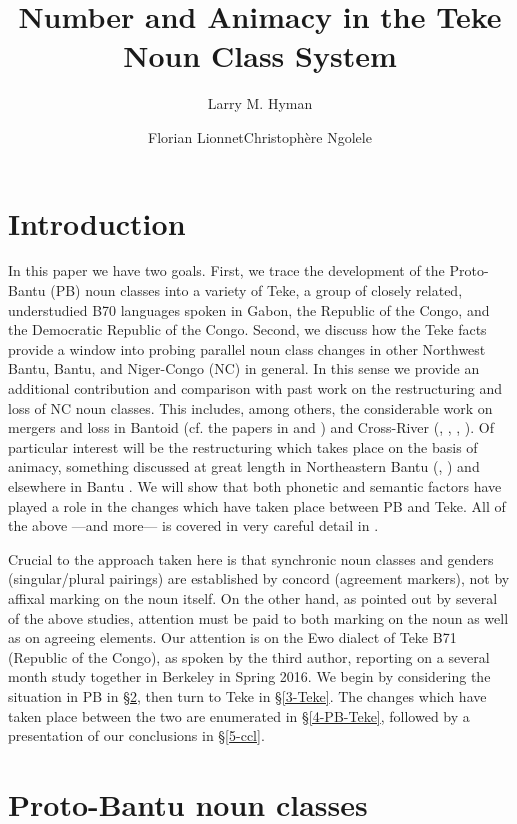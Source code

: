 \documentclass[output=paper,,modfonts,nonflat]{langsci/langscibook-Hyman-et-al}
\title{Number and Animacy in the Teke Noun Class System}
\author{Larry M. Hyman\affiliation{University of California, Berkeley}\and  Florian Lionnet\affiliation{Princeton University}\lastand  Christophère Ngolele\affiliation{Université Catholique d'Afrique Centrale, Yaoundé}}
\begin{document}
\maketitle
\section{Introduction} 
\label{intro}

In this paper we have two goals. First, we trace the development of the Proto-Bantu (PB) noun classes into a variety of Teke, a group of closely related, understudied B70 languages spoken in Gabon, the Republic of the Congo, and the Democratic Republic of the Congo. Second, we discuss how the Teke facts provide a window into probing parallel noun class changes in other Northwest Bantu, Bantu, and Niger-Congo (NC) in general. In this sense we provide an additional contribution and comparison with past work on the restructuring and loss of NC noun classes. This includes, among others, the considerable work on mergers and loss in Bantoid (cf. the papers in \cite{hyman1980}  and \cite{hymanvoorhoeve1980}) and Cross-River (\cite{williamson1985}, \cite{faraclas1986}, \cite{connell1987}, \cite{hymanudoh2006}). Of particular interest will be the restructuring which takes place on the basis of animacy, something discussed at great length in Northeastern Bantu (\cite{wald1975}, \cite{contini2008}) and elsewhere in Bantu . We will show that both phonetic and semantic factors have played a role in the changes which have taken place between PB and Teke. All of the above ---and more--- is covered in very careful detail in \citet{good2012}.

Crucial to the approach taken here is that synchronic noun classes and genders (singular/plural pairings) are established by concord (agreement markers), not by affixal marking on the noun itself. On the other hand, as pointed out by several of the above studies, attention must be paid to both marking on the noun as well as on agreeing elements. Our attention is on the Ewo dialect of Teke B71 (Republic of the Congo), as spoken by the third author, reporting on a several month study together in Berkeley in Spring 2016. We begin by considering the situation in PB in \S\ref{2-PB}, then turn to Teke in \S\ref{3-Teke}. The changes which have taken place between the two are enumerated in \S\ref{4-PB-Teke}, followed by a presentation of our conclusions in \S\ref{5-ccl}.


\section{Proto-Bantu noun classes} 
\label{2-PB}
\end{document}
